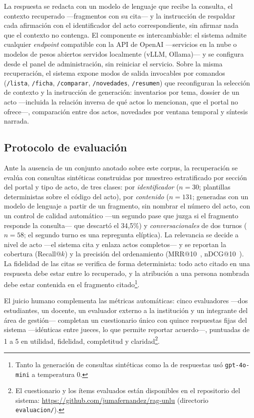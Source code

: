 \documentclass{llncs}
\begin{document}
La respuesta se redacta con un modelo de lenguaje que recibe la consulta, el
contexto recuperado ---fragmentos con su cita--- y la instrucción de respaldar
cada afirmación con el identificador del acto correspondiente, sin afirmar
nada que el contexto no contenga. El componente es intercambiable: el sistema
admite cualquier \emph{endpoint} compatible con la API de OpenAI ---servicios en
la nube o modelos de pesos abiertos servidos localmente (vLLM, Ollama)--- y se
configura desde el panel de administración, sin reiniciar el servicio. Sobre
la misma recuperación, el sistema expone modos de salida invocables por
comandos (\texttt{/lista}, \texttt{/ficha}, \texttt{/comparar},
\texttt{/novedades}, \texttt{/resumen}) que reconfiguran la selección de
contexto y la instrucción de generación: inventarios por tema, dossier de un
acto ---incluida la relación inversa de qué actos lo mencionan, que el portal
no ofrece---, comparación entre dos actos, novedades por ventana temporal y
síntesis narrada.

\subsection{Protocolo de evaluación}
\label{sec:evaluacion}

Ante la ausencia de un conjunto anotado sobre este corpus, la
recuperación se evalúa con consultas sintéticas construidas por muestreo
estratificado por sección del portal y tipo de acto, de tres clases: por
\emph{identificador} ($n=30$; plantillas deterministas sobre el código del
acto), por \emph{contenido} ($n=131$; generadas con un modelo de lenguaje a
partir de un fragmento, sin nombrar el número del acto, con un control de
calidad automático ---un segundo pase que juzga si el fragmento responde la
consulta--- que descartó el 34{,}5\%) y \emph{conversacionales} de dos
turnos ($n=58$; el segundo turno es una repregunta elíptica). La relevancia se
decide a nivel de acto ---el sistema cita y enlaza actos completos--- y se
reportan la cobertura (Recall@$k$) y la precisión del ordenamiento
(MRR@10~\cite{voorhees1999trec}, nDCG@10~\cite{jarvelin2002cumulated}). La fidelidad de las citas se verifica de
forma determinista: todo acto citado en una respuesta debe estar entre lo
recuperado, y la atribución a una persona nombrada debe estar contenida en el
fragmento citado\footnote{Tanto la generación de consultas sintéticas como la de
respuestas usó \texttt{gpt-4o-mini} a temperatura 0.}.

\label{sec:humana}El juicio humano complementa las métricas automáticas:
cinco evaluadores ---dos estudiantes, un docente, un evaluador externo a la
institución y un integrante del área de gestión--- completan un cuestionario
único con quince respuestas fijas del sistema ---idénticas entre jueces, lo
que permite reportar acuerdo---, puntuadas de 1 a 5 en utilidad, fidelidad,
completitud y claridad\footnote{El cuestionario y los ítems evaluados
están disponibles en el repositorio del sistema:
\url{https://github.com/jumafernandez/rag-unlu} (directorio
\texttt{evaluacion/}).}.
\end{document}
